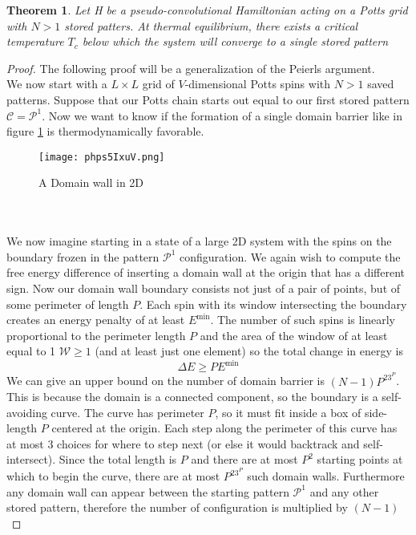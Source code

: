 \documentclass{article}
\newtheorem{theorem}{Theorem}[section]
\theoremstyle{definition}
\theoremstyle{remark}
\begin{document}
\begin{theorem}
    Let H be a pseudo-convolutional Hamiltonian acting on a Potts grid with $N>1$ stored patters. At thermal equilibrium, there exists a critical temperature $T_c$ below which the system will converge to a single stored pattern
\end{theorem}
\begin{proof}
    The following proof will be a generalization of the Peierls argument.\\
    We now start with a $L\times L$ grid of $V$-dimensional Potts spins with $N>1$ saved patterns. Suppose that our Potts chain starts out equal to our first stored pattern $\mathcal C=\mathcal P^1$. Now we want to know if the formation of a single domain barrier like in figure \ref{fig:domain_wall_2D} is thermodynamically favorable.
    \begin{figure}[h]
        \centering
        \texttt{[image: phps5IxuV.png]}
        \caption{A Domain wall in 2D}
        \label{fig:domain_wall_2D}
    \end{figure}
    \\\\
    We now imagine starting in a state of a large 2D system with the spins on the boundary frozen in the pattern $\mathcal P^1$ configuration. We again wish to compute the free energy difference of inserting a domain wall at the origin that has a different sign. Now our domain wall boundary consists not just of a pair of points, but of some perimeter of length $P$. Each spin with its window intersecting the boundary creates an energy penalty of at least $E^\textrm{min}$. The number of such spins is linearly proportional to the perimeter length $P$ and the area of the window of at least equal to 1 $\mathcal W\ge 1$ (and at least just one element) so the total change in energy is 
    \begin{equation}
        \label{eq:energy_bounds}
        \Delta E\ge P E^\textrm{min}
    \end{equation}
    We can give an upper bound on the number of domain barrier is $(N-1)P^23^P$. This is because the domain is a connected component, so the boundary is a self-avoiding curve. The curve has perimeter $P$, so it must fit inside a box of side-length $P$ centered at the origin. Each step along the perimeter of this curve has at most $3$ choices for where to step next (or else it would backtrack and self-intersect). Since the total length is $P$ and there are at most $P^2$ starting points at which to begin the curve, there are at most $P^23^P$ such domain walls. Furthermore any domain wall can appear between the starting pattern $\mathcal P^1$ and any other stored pattern, therefore the number of configuration is multiplied by $(N-1)$

\end{proof}
\end{document}

